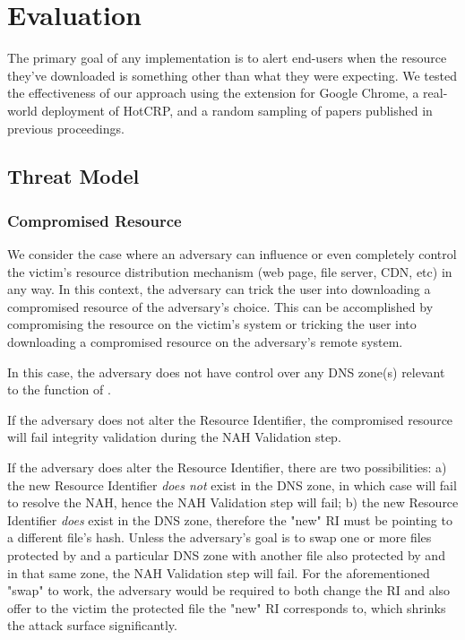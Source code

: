 \section{Evaluation} \label{sec:evaluation}

The primary goal of any \SYSTEM{} implementation is to alert end-users when the
resource they've downloaded is something other than what they were expecting. We
tested the effectiveness of our approach using the \SYSTEM{} extension for
Google Chrome, a real-world deployment of HotCRP, and a random sampling of
papers published in previous \CONFERENCE{} proceedings.

\subsection{Threat Model}

\subsubsection{Compromised Resource}

We consider the case where an adversary can influence or even completely control
the victim's resource distribution mechanism (web page, file server, CDN, etc)
in any way. In this context, the adversary can trick the user into downloading a
compromised resource of the adversary's choice. This can be accomplished by
compromising the resource on the victim's system or tricking the user into
downloading a compromised resource on the adversary's remote system.

In this case, the adversary does not have control over any DNS zone(s) relevant
to the function of \SYSTEM{}.

If the adversary does not alter the Resource Identifier, the compromised
resource will fail integrity validation during the NAH Validation step.

If the adversary does alter the Resource Identifier, there are two
possibilities: a) the new Resource Identifier \textit{does not} exist in the DNS
zone, in which case \SYSTEM{} will fail to resolve the NAH, hence the NAH
Validation step will fail; b) the new Resource Identifier \textit{does} exist in
the DNS zone, therefore the "new" RI must be pointing to a different file's
hash. Unless the adversary's goal is to swap one or more files protected by
\SYSTEM{} and a particular DNS zone with another file also protected by
\SYSTEM{} and in that same zone, the NAH Validation step will fail. For the
aforementioned "swap" to work, the adversary would be required to both change
the RI and also offer to the victim the \SYSTEM{} protected file the "new" RI
corresponds to, which shrinks the attack surface significantly.


